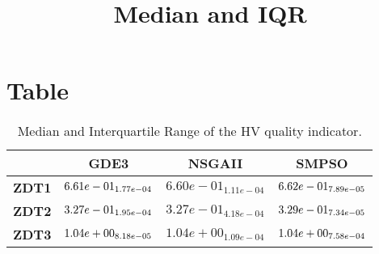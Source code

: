 \documentclass{article}
\title{Median and IQR}
\author{}
\begin{document}
\maketitle
\section{Table}
\begin{table}[!htp]
  \caption{Median and Interquartile Range of the HV quality indicator.}
  \label{table:HV}
  \centering
  \begin{scriptsize}
  \begin{tabular}{c|ccc}
      & \textbf{GDE3} & \textbf{NSGAII} & \textbf{SMPSO} \\\hline
      \textbf{ZDT1} & $\cellcolor{gray25} 6.61e-01_{1.77e-04} $ & $ 6.60e-01_{1.11e-04} $ & $ \cellcolor{gray95} 6.62e-01_{7.89e-05}$ \\
      \textbf{ZDT2} & $\cellcolor{gray25} 3.27e-01_{1.95e-04} $ & $ 3.27e-01_{4.18e-04} $ & $ \cellcolor{gray95} 3.29e-01_{7.34e-05}$ \\
      \textbf{ZDT3} & $\cellcolor{gray95} 1.04e+00_{8.18e-05} $ & $ 1.04e+00_{1.09e-04} $ & $ \cellcolor{gray25} 1.04e+00_{7.58e-04}$ \\
  \end{tabular}
  \end{scriptsize}
\end{table}
\end{document}
